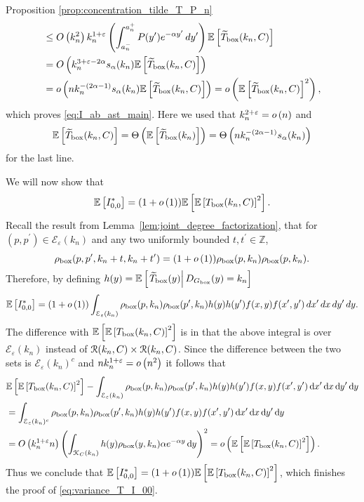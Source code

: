 \begin{proofof}{Proposition \ref{prop:concentration_tilde_T_P_n}}
\begin{align*}
	&\le O\left(k_n^2\right) k_n^{1+\varepsilon} \left(\int_{a_n^-}^{a_n^+} P(y^\prime) 
		e^{-\alpha y^\prime} \, dy^\prime\right) \mathbb{E}\left[\widetilde{T}_{\text{box}}(k_n,C)\right]\\
	&= O\left(k_n^{3 + \varepsilon -2\alpha} s_\alpha(k_n) \mathbb{E}\left[\widetilde{T}_{\text{box}}(k_n,C)\right]\right)\\
	&= o\left(n k_n^{-(2\alpha - 1)}s_\alpha(k_n) \mathbb{E}\left[\widetilde{T}_{\text{box}}(k_n,C)\right]\right) 
		= o\left(\mathbb{E}\left[\widetilde{T}_{\text{box}}(k_n,C)\right]^2\right),
\end{align*}
which proves \eqref{eq:I_ab_ast_main}. Here we used that $k_n^{2 + \varepsilon} = o\left(n\right)$ and
\[
	\mathbb{E}\left[\widetilde{T}_{\text{box}}(k_n,C)\right] = \Theta\left(\mathbb{E}\left[\widetilde{T}_{\text{box}}(k_n)\right]\right) 
	= \Theta\left(n k_n^{-(2\alpha - 1)}s_\alpha(k_n)\right)
\] 
for the last line.

We will now show that
\[
	\mathbb{E}\left[I^\ast_{0,0}\right] = (1+o\left(1\right))\mathbb{E}\left[\mathbb{E}\left[T_{\text{box}}(k_n,C)\right]^2\right].
\]
Recall the result from Lemma~\ref{lem:joint_degree_factorization}, that for $(p,p^\prime) \in \mathcal{E}_{\varepsilon}(k_n)$ and any two uniformly bounded $t, t^\prime \in \mathbb{Z}$,
\[
	\rho_{\text{box}}(p,p^\prime,k_n + t,k_n+t^\prime) = (1 + o\left(1\right))\rho_{\text{box}}(p,k_n)\rho_{\text{box}}(p,k_n).
\]
Therefore, by defining $h(y) = \mathbb{E}\left[\left.\widetilde{T}_{\text{box}}(y)\right|D_{G_{\mathrm{box}}}(y) = k_n\right]$
\[
	\mathbb{E}\left[I_{0,0}^\ast\right] = (1 + o\left(1\right))\int_{\mathcal{E}_{\varepsilon}(k_n)}\rho_{\text{box}}(p,k_n)
		\rho_{\text{box}}(p^\prime,k_n)
		h(y) h(y^\prime) f(x,y)	f(x^\prime,y^\prime) \, dx^\prime \, dx \, dy^\prime \, dy.
\]
The difference with $\mathbb{E}\left[\mathbb{E}\left[T_{\text{box}}(k_n,C)\right]^2\right]$ is in that the above integral is over $\mathcal{E}_\varepsilon(k_n)$ instead of ${\mathcal R}(k_n,C) \times {\mathcal R}(k_n,C)$. Since the difference between the two sets is 
$\mathcal{E}_\varepsilon(k_n)^c$ and $n k_n^{1+\varepsilon} = o\left(n^2\right)$ it follows that
\begin{align*}
	&\mathbb{E}\left[\mathbb{E}\left[T_{\text{box}}(k_n,C)\right]^2\right]
		- \int_{\mathcal{E}_{\varepsilon}(k_n)}\rho_{\text{box}}(p,k_n)\rho_{\text{box}}(p^\prime,k_n)
		h(y) h(y^\prime) f(x,y)	f(x^\prime,y^\prime) \operatorname{\mathrm{d}\hspace{-2pt}} x^\prime \operatorname{\mathrm{d}\hspace{-2pt}} x \operatorname{\mathrm{d}\hspace{-2pt}} y^\prime \operatorname{\mathrm{d}\hspace{-2pt}} y\\
	&= \int_{\mathcal{E}_{\varepsilon}(k_n)^c}\rho_{\text{box}}(p,k_n)\rho_{\text{box}}(p^\prime,k_n)
		h(y) h(y^\prime) f(x,y)	f(x^\prime,y^\prime) \operatorname{\mathrm{d}\hspace{-2pt}} x^\prime \operatorname{\mathrm{d}\hspace{-2pt}} x \operatorname{\mathrm{d}\hspace{-2pt}} y^\prime \operatorname{\mathrm{d}\hspace{-2pt}} y\\
	&= O\left(k_n^{1+\varepsilon}n\right) 
		\left(\int_{{\mathcal K}_{C}(k_n)}h(y)\rho_{\text{box}}(y,k_n)\alpha e^{-\alpha y} \operatorname{\mathrm{d}\hspace{-2pt}} y\right)^2
		= o\left(\mathbb{E}\left[\mathbb{E}\left[T_{\text{box}}(k_n,C)\right]^2\right]\right).
\end{align*}
Thus we conclude that $\mathbb{E}\left[I^\ast_{0,0}\right] = (1+o\left(1\right))\mathbb{E}\left[\mathbb{E}\left[T_{\text{box}}(k_n,C)\right]^2\right]$, which finishes the proof of \eqref{eq:variance_T_I_00}.


\end{proofof}
